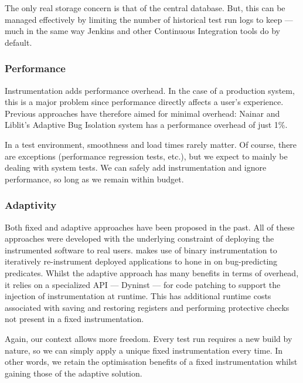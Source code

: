 The only real storage concern is that of the central database. But, this can be
managed effectively by limiting the number of historical test run logs to keep
--- much in the same way Jenkins and other Continuous Integration tools do by
default.

\subsubsection{Performance}

Instrumentation adds performance overhead. In the case of a production system,
this is a major problem since performance directly affects a user's experience.
Previous approaches have therefore aimed for minimal overhead: Nainar and
Liblit's \cite{ArumugaNainar:2010:ABI:1806799.1806839} Adaptive Bug Isolation
system has a performance overhead of just 1\%.

In a test environment, smoothness and load times rarely matter. Of course, there
are exceptions (performance regression tests, etc.), but we expect to mainly be
dealing with system tests. We can safely add instrumentation and ignore
performance, so long as we remain within budget.

\subsubsection{Adaptivity}

Both fixed \cite{Liblit:2003:BIV:781131.781148} \cite{NIPS2003_AP05}
\cite{ArumugaNainar:2007:SDU:1273463.1273467}
\cite{Andrzejewski:2007:SDU:1421665.1421672}
\cite{Parsa:2011:SDU:2045625.2045659} and adaptive
\cite{ArumugaNainar:2010:ABI:1806799.1806839} approaches have been proposed in
the past. All of these approaches were developed with the underlying constraint
of deploying the instrumented software to real users.
\cite{ArumugaNainar:2010:ABI:1806799.1806839} makes use of binary
instrumentation to iteratively re-instrument deployed applications to hone in on
bug-predicting predicates. Whilst the adaptive approach has many benefits in
terms of overhead, it relies on a specialized API --- Dyninst \cite{dyninst} ---
for code patching to support the injection of instrumentation at runtime. This
has additional runtime costs \cite{DyninstGuide} associated with saving and
restoring registers and performing protective checks not present in a fixed
instrumentation.

Again, our context allows more freedom. Every test run requires a new build by
nature, so we can simply apply a unique fixed instrumentation every time. In
other words, we retain the optimisation benefits of a fixed instrumentation
whilst gaining those of the adaptive solution.
